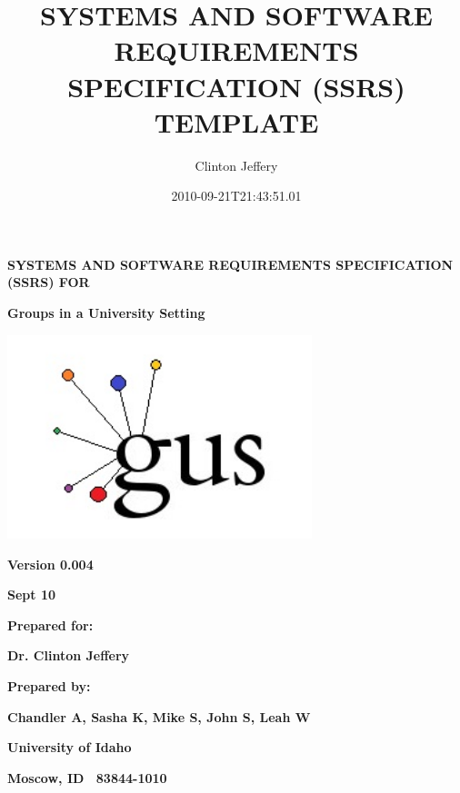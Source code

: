 \documentclass[letterpaper]{article}
\title{SYSTEMS AND SOFTWARE REQUIREMENTS SPECIFICATION (SSRS) TEMPLATE}
\author{Clinton Jeffery}
\date{2010-09-21T21:43:51.01}
\begin{document}
\clearpage\clearpage\setcounter{page}{1}\pagestyle{MP}
\thispagestyle{MPF}
{\centering\bfseries\color{black}
SYSTEMS AND SOFTWARE REQUIREMENTS SPECIFICATION (SSRS) FOR
\par}


\bigskip

{\centering\bfseries\color{black}
Groups in a University Setting
\par}


\bigskip

{\centering 
\includegraphics[width=3.4882in,height=2.3374in]{Gusspec-img1.jpg}
\par}


\bigskip


\bigskip


\bigskip

{\centering\bfseries\color{black}
Version 0.004
\par}

{\centering\bfseries\color{black}
Sept 10
\par}


\bigskip


\bigskip

{\centering\bfseries\color{black}
Prepared for:
\par}

{\centering\bfseries\color{black}
Dr. Clinton Jeffery
\par}


\bigskip


\bigskip

{\centering\bfseries\color{black}
Prepared by:
\par}

{\centering\bfseries\color{black}
Chandler A, Sasha K, Mike S, John S, Leah W
\par}

{\centering\bfseries\color{black}
University of Idaho
\par}

{\centering\bfseries\color{black}
Moscow, ID \ 83844-1010
\par}
\end{document}
